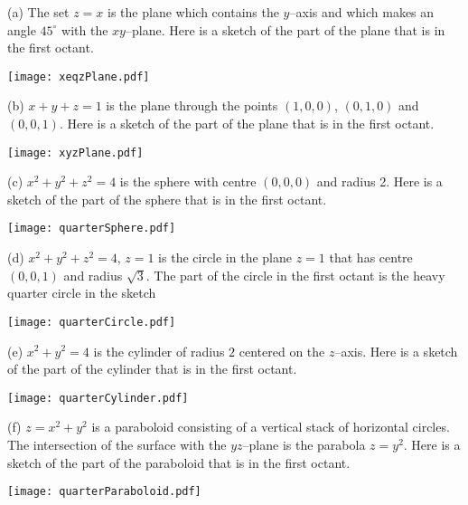 %


\begin{answer}
(a)
The set $z=x$ is the plane which contains the $y$--axis and which  
makes an angle $45^\circ$ with the $xy$--plane. Here is a sketch 
of the part of the plane that is in the first octant.

\begin{center}
     \texttt{[image: xeqzPlane.pdf]}
\end{center}


(b)
$x+y+z=1$ is the plane through the points $(1,0,0)$, $(0,1,0)$
and  $(0,0,1)$. Here is a sketch of the part of the plane 
that is in the first octant.

\begin{center}
     \texttt{[image: xyzPlane.pdf]}
\end{center}


(c)
$x^2+y^2+z^2=4$ is the sphere with centre $(0,0,0)$ and radius 2.
Here is a sketch of the part of the sphere that is in the first octant.

\begin{center}
     \texttt{[image: quarterSphere.pdf]}
\end{center}

(d)
$x^2+y^2+z^2=4$, $z=1$ is the circle in the plane $z=1$ 
that has centre $(0,0,1)$ and radius $\sqrt{3}$. The part of the circle
in the first octant is the heavy quarter circle in the sketch

\begin{center}
     \texttt{[image: quarterCircle.pdf]}
\end{center}


(e)
$x^2+y^2=4$ is the cylinder of radius $2$ centered on the $z$--axis.
Here is a sketch of the part of the cylinder that is in the first octant.

\begin{center}
     \texttt{[image: quarterCylinder.pdf]}
\end{center}


(f) $z=x^2+y^2$ is a paraboloid consisting of a vertical stack of 
horizontal circles. The intersection of the surface with the $yz$--plane 
is the parabola $z=y^2$.  Here is a sketch of the part of the paraboloid 
that is in the first octant.

\begin{center}
     \texttt{[image: quarterParaboloid.pdf]}
\end{center}

\end{answer}


